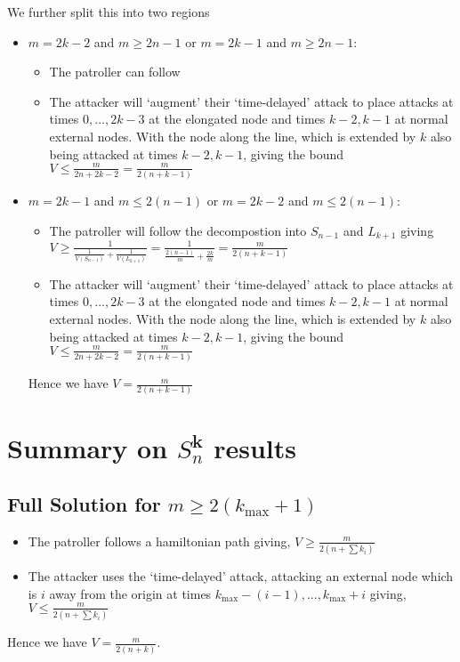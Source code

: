 \documentclass[a4paper,10pt]{article}
\theoremstyle{definition}
\theoremstyle{definition}
\theoremstyle{remark}
\theoremstyle{definition}
\begin{document}
We further split this into two regions

\begin{itemize}
\item $m=2k-2$ and $m \geq 2n-1$ or $m=2k-1$ and $m \geq 2n-1$:

 \begin{itemize}
 \item The patroller can follow 

  \item The attacker will `augment' their `time-delayed' attack to place attacks at times $0,...,2k-3$ at the elongated node and times $k-2,k-1$ at normal external nodes. With the node along the line, which is extended by $k$ also being attacked at times $k-2,k-1$, giving the bound $V \leq \frac{m}{2n + 2k-2}=\frac{m}{2(n+k-1)}$
 \end{itemize}

\item $m=2k-1$ and $m \leq 2(n-1)$ or $m=2k-2$ and $m \leq 2(n-1)$:

 \begin{itemize}
 \item The patroller will follow the decompostion into $S_{n-1}$ and $L_{k+1}$ giving $V \geq \frac{1}{\frac{1}{V(S_{n-1})}+\frac{1}{V(L_{k+1})}}=\frac{1}{\frac{2(n-1)}{m}+\frac{2k}{m}}=\frac{m}{2(n+k-1)}$
 \item The attacker will `augment' their `time-delayed' attack to place attacks at times $0,...,2k-3$ at the elongated node and times $k-2,k-1$ at normal external nodes. With the node along the line, which is extended by $k$ also being attacked at times $k-2,k-1$, giving the bound $V \leq \frac{m}{2n + 2k-2}=\frac{m}{2(n+k-1)}$
 \end{itemize}  
 Hence we have $V=\frac{m}{2(n+k-1)}$
 
\end{itemize}

\section[]{Summary on $S_{n}^{\bm{k}}$ results}

\subsection[]{Full Solution for $m \geq 2(k_{\max} +1)$}

\begin{itemize}
\item The patroller follows a hamiltonian path giving, $V \geq \frac{m}{2(n+\sum k_{i})}$
\item The attacker uses the `time-delayed' attack, attacking an external node which is $i$ away from the origin at times $k_{\max}-(i-1),...,k_{\max}+i$ giving, $V \leq \frac{m}{2(n+ \sum k_{i})}$
\end{itemize}
Hence we have $V= \frac{m}{2(n+k)}$.
\end{document}
